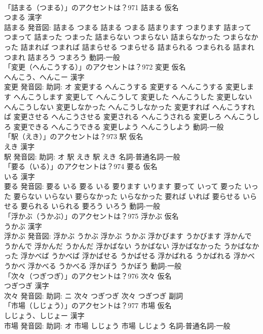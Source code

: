 \documentclass[8pt]{extreport}
\begin{document}
\begin{CJK}{UTF8}{min}
\\	「詰まる（つまる）」のアクセントは？971	詰まる 仮名　
\\	つまる 漢字　
\\	詰まる 発音図:	詰まる つまる		詰まる つまる 詰まります つまります 詰まって つまって 詰まった つまった 詰まらない つまらない 詰まらなかった つまらなかった 詰まれば つまれば 詰まらせる つまらせる 詰まられる つまられる 詰まれ つまれ 詰まろう つまろう				動詞-一般 
\\	「変更（へんこうする）」のアクセントは？972	変更 仮名　
\\	へんこう、へんこー 漢字　
\\	変更 発音図: 助詞: オ	変更する へんこうする		変更する へんこうする 変更します へんこうします 変更して へんこうして 変更した へんこうした 変更しない へんこうしない 変更しなかった へんこうしなかった 変更すれば へんこうすれば 変更させる へんこうさせる 変更される へんこうされる 変更しろ へんこうしろ 変更できる へんこうできる 変更しよう へんこうしよう				動詞-一般 
\\	「駅（えき）」のアクセントは？973	駅 仮名　
\\	えき 漢字　
\\	駅 発音図: 助詞: オ	駅 えき		駅 えき				名詞-普通名詞-一般 
\\	「要る（いる）」のアクセントは？974	要る 仮名　
\\	いる 漢字　
\\	要る 発音図:	要る いる		要る いる 要ります いります 要って いって 要った いった 要らない いらない 要らなかった いらなかった 要れば いれば 要らせる いらせる 要られる いられる 要ろう いろう				動詞-一般 
\\	「浮かぶ（うかぶ）」のアクセントは？975	浮かぶ 仮名　
\\	うかぶ 漢字　
\\	浮かぶ 発音図:	浮かぶ うかぶ		浮かぶ うかぶ 浮かびます うかびます 浮かんで うかんで 浮かんだ うかんだ 浮かばない うかばない 浮かばなかった うかばなかった 浮かべば うかべば 浮かばせる うかばせる 浮かばれる うかばれる 浮かべ うかべ 浮かべる うかべる 浮かぼう うかぼう				動詞-一般 
\\	「次々（つぎつぎ）」のアクセントは？976	次々 仮名　
\\	つぎつぎ 漢字　
\\	次々 発音図: 助詞: ニ	次々 つぎつぎ		次々 つぎつぎ				副詞 
\\	「市場（しじょう）」のアクセントは？977	市場 仮名　
\\	しじょう、しじょー 漢字　
\\	市場 発音図: 助詞: オ	市場 しじょう		市場 しじょう				名詞-普通名詞-一般 

\end{CJK}
\end{document}
